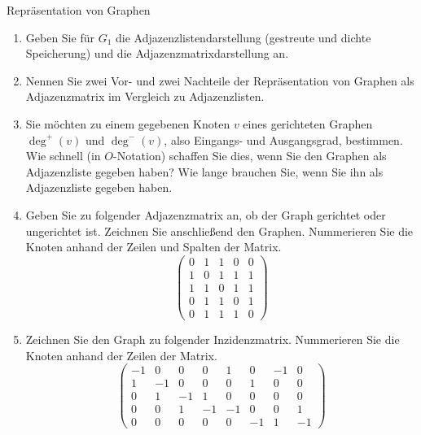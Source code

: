 \documentclass[11pt,a4paper]{article}
\begin{document}
\begin{aufgabe}{1}{Repräsentation von Graphen}
\begin{figure}[h!]
\begin{tikzpicture}[scale=0.15]
        \end{tikzpicture}
    \end{figure}
    \begin{enumerate}
        \item Geben Sie für $G_1$ die Adjazenzlistendarstellung (gestreute und dichte Speicherung) und die Adjazenzmatrixdarstellung an.
        \item Nennen Sie zwei Vor- und zwei Nachteile der Repräsentation von Graphen als Adjazenzmatrix im Vergleich zu Adjazenzlisten.
        \item Sie möchten zu einem gegebenen Knoten $v$ eines gerichteten Graphen $\operatorname{deg}^+(v)$ und $\operatorname{deg}^-(v)$, also Eingangs- und Ausgangsgrad, bestimmen.
        Wie schnell (in $O$-Notation) schaffen Sie dies, wenn Sie den Graphen als Adjazenzliste gegeben haben?
        Wie lange brauchen Sie, wenn Sie ihn als Adjazenzliste gegeben haben.
        \item 
        Geben Sie zu folgender Adjazenzmatrix an, ob der Graph gerichtet oder ungerichtet ist.
        Zeichnen Sie anschließend den Graphen.
        Nummerieren Sie die Knoten anhand der Zeilen und Spalten der Matrix.
        \begin{equation*}
            \begin{pmatrix}
                0 & 1 & 1 & 0 & 0 \\
                1 & 0 & 1 & 1 & 1 \\
                1 & 1 & 0 & 1 & 1 \\
                0 & 1 & 1 & 0 & 1 \\
                0 & 1 & 1 & 1 & 0 
            \end{pmatrix}
        \end{equation*}
        \item Zeichnen Sie den Graph zu folgender Inzidenzmatrix.
        Nummerieren Sie die Knoten anhand der Zeilen der Matrix.
        \begin{equation*}
            \begin{pmatrix}
                -1 & 0 & 0 & 0 & 1 & 0 & -1 & 0 \\
                1 & -1 & 0 & 0 & 0 & 1 & 0 & 0 \\
                0 & 1 & -1 & 1 & 0 & 0 & 0 & 0 \\
                0 & 0 & 1 & -1 & -1 & 0 & 0 & 1 \\
                0 & 0 & 0 & 0 & 0 & -1 & 1 & -1
            \end{pmatrix}
        \end{equation*}
    \end{enumerate}
\end{aufgabe}
\end{document}
